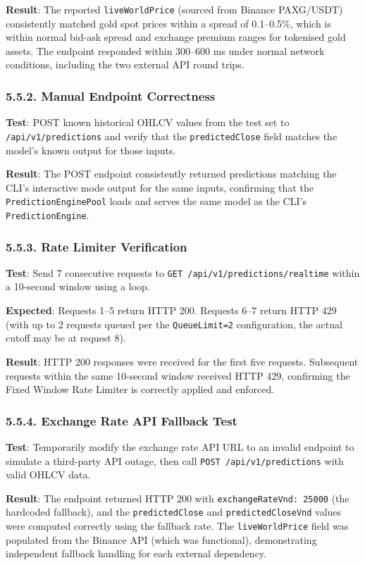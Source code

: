 \textbf{Result}: The reported \texttt{liveWorldPrice} (sourced from Binance PAXG/USDT) consistently matched gold spot prices within a spread of 0.1--0.5\%, which is within normal bid-ask spread and exchange premium ranges for tokenised gold assets. The endpoint responded within 300--600 ms under normal network conditions, including the two external API round trips.

\subsubsection{5.5.2. Manual Endpoint Correctness}
\textbf{Test}: POST known historical OHLCV values from the test set to \texttt{/api/v1/predictions} and verify that the \texttt{predictedClose} field matches the model's known output for those inputs.

\textbf{Result}: The POST endpoint consistently returned predictions matching the CLI's interactive mode output for the same inputs, confirming that the \texttt{PredictionEnginePool} loads and serves the same model as the CLI's \texttt{PredictionEngine}.

\subsubsection{5.5.3. Rate Limiter Verification}
\textbf{Test}: Send 7 consecutive requests to \texttt{GET /api/v1/predictions/realtime} within a 10-second window using a loop.

\textbf{Expected}: Requests 1--5 return HTTP 200. Requests 6--7 return HTTP 429 (with up to 2 requests queued per the \texttt{QueueLimit=2} configuration, the actual cutoff may be at request 8).

\textbf{Result}: HTTP 200 responses were received for the first five requests. Subsequent requests within the same 10-second window received HTTP 429, confirming the Fixed Window Rate Limiter is correctly applied and enforced.

\subsubsection{5.5.4. Exchange Rate API Fallback Test}
\textbf{Test}: Temporarily modify the exchange rate API URL to an invalid endpoint to simulate a third-party API outage, then call \texttt{POST /api/v1/predictions} with valid OHLCV data.

\textbf{Result}: The endpoint returned HTTP 200 with \texttt{exchangeRateVnd: 25000} (the hardcoded fallback), and the \texttt{predictedClose} and \texttt{predictedCloseVnd} values were computed correctly using the fallback rate. The \texttt{liveWorldPrice} field was populated from the Binance API (which was functional), demonstrating independent fallback handling for each external dependency.


